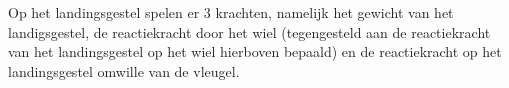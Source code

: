 \documentclass{article}
\begin{document}
\begin{maplegroup}
\begin{Maple Normal}{
Op het landingsgestel spelen er 3 krachten, namelijk het gewicht van het landigsgestel, de reactiekracht door het wiel (tegengesteld aan de reactiekracht van het landingsgestel op het wiel hierboven bepaald) en de reactiekracht op het landingsgestel omwille van de vleugel.}\end{Maple Normal}

\end{maplegroup}
\begin{maplegroup}
\begin{mapleinput}
\end{mapleinput}
\mapleresult
{}
\end{maplegroup}
\end{document}
